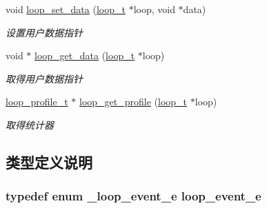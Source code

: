 \begin{DoxyCompactItemize}
void \hyperlink{a00105_ga480fadf19a49cb27354866e06500a03c_ga480fadf19a49cb27354866e06500a03c}{loop\+\_\+set\+\_\+data} (\hyperlink{a00051_a9c3ad1cd2de83e09f3a7b59fa82c94ee_a9c3ad1cd2de83e09f3a7b59fa82c94ee}{loop\+\_\+t} $\ast$loop, void $\ast$data)
\begin{DoxyCompactList}\small\item\em 设置用户数据指针 \end{DoxyCompactList}\item 
void $\ast$ \hyperlink{a00069_aaec184f54f4ccb89ab5fa003345cd338_aaec184f54f4ccb89ab5fa003345cd338}{loop\+\_\+get\+\_\+data} (\hyperlink{a00051_a9c3ad1cd2de83e09f3a7b59fa82c94ee_a9c3ad1cd2de83e09f3a7b59fa82c94ee}{loop\+\_\+t} $\ast$loop)
\begin{DoxyCompactList}\small\item\em 取得用户数据指针 \end{DoxyCompactList}\item 
\hyperlink{a00051_ad060e1396346d2f5db1ec0597376a107_ad060e1396346d2f5db1ec0597376a107}{loop\+\_\+profile\+\_\+t} $\ast$ \hyperlink{a00105_gad3f87700814d56a619ab5517b1f5fe5b_gad3f87700814d56a619ab5517b1f5fe5b}{loop\+\_\+get\+\_\+profile} (\hyperlink{a00051_a9c3ad1cd2de83e09f3a7b59fa82c94ee_a9c3ad1cd2de83e09f3a7b59fa82c94ee}{loop\+\_\+t} $\ast$loop)
\begin{DoxyCompactList}\small\item\em 取得统计器 \end{DoxyCompactList}\end{DoxyCompactItemize}


\subsection{类型定义说明}
\hypertarget{a00069_ab92fe4e788615cfd56530167651a8ff4_ab92fe4e788615cfd56530167651a8ff4}{}
\subsubsection[{loop\+\_\+event\+\_\+e}]{\setlength{\rightskip}{0pt plus 5cm}typedef enum {\bf \+\_\+loop\+\_\+event\+\_\+e}  {\bf loop\+\_\+event\+\_\+e}}\label{a00069_ab92fe4e788615cfd56530167651a8ff4_ab92fe4e788615cfd56530167651a8ff4}
\hypertarget{a00069_a1095ee772017ce29dcac0987c456709e_a1095ee772017ce29dcac0987c456709e}{}

